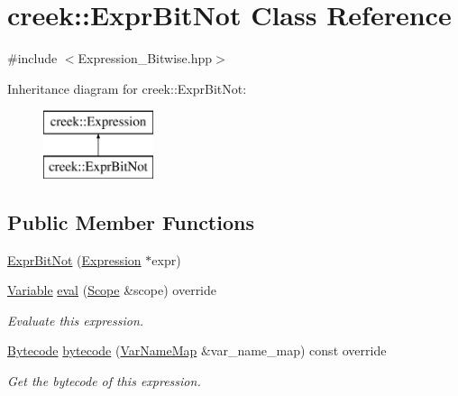 \hypertarget{classcreek_1_1_expr_bit_not}{}\section{creek\+:\+:Expr\+Bit\+Not Class Reference}
\label{classcreek_1_1_expr_bit_not}


{\ttfamily \#include $<$Expression\+\_\+\+Bitwise.\+hpp$>$}

Inheritance diagram for creek\+:\+:Expr\+Bit\+Not\+:\begin{figure}[H]
\begin{center}
\leavevmode
\includegraphics[height=2.000000cm]{classcreek_1_1_expr_bit_not}
\end{center}
\end{figure}
\subsection*{Public Member Functions}
\begin{DoxyCompactItemize}
\item 
\hyperlink{classcreek_1_1_expr_bit_not_a0b09983449c5710dc361f3b33a37b3aa}{Expr\+Bit\+Not} (\hyperlink{classcreek_1_1_expression}{Expression} $\ast$expr)
\item 
\hyperlink{classcreek_1_1_variable}{Variable} \hyperlink{classcreek_1_1_expr_bit_not_aa8b898516fef2e8da32e660cc70f677e}{eval} (\hyperlink{classcreek_1_1_scope}{Scope} \&scope) override
\begin{DoxyCompactList}\small\item\em Evaluate this expression. \end{DoxyCompactList}\item 
\hyperlink{classcreek_1_1_bytecode}{Bytecode} \hyperlink{classcreek_1_1_expr_bit_not_a3c8cc5d092878762958c00305f4e1510}{bytecode} (\hyperlink{classcreek_1_1_var_name_map}{Var\+Name\+Map} \&var\+\_\+name\+\_\+map) const  override\hypertarget{classcreek_1_1_expr_bit_not_a3c8cc5d092878762958c00305f4e1510}{}\label{classcreek_1_1_expr_bit_not_a3c8cc5d092878762958c00305f4e1510}

\begin{DoxyCompactList}\small\item\em Get the bytecode of this expression. \end{DoxyCompactList}\end{DoxyCompactItemize}



